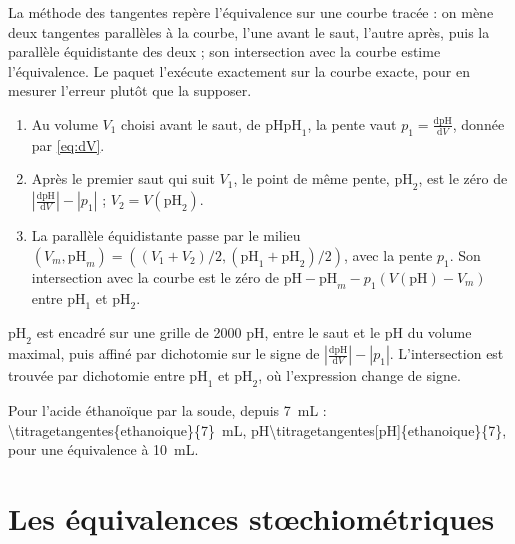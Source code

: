 \documentclass[a4paper,11pt]{article}
\newcommand\pH{\ensuremath{\mathrm{pH}}\xspace}
\newcommand\ddp[2]{\frac{\mathrm{d}#1}{\mathrm{d}#2}}
\newcommand\pare[1]{\left(#1\right)}
\begin{document}
La méthode des tangentes repère l'équivalence sur une courbe tracée : on mène deux tangentes parallèles à la courbe, l'une avant le saut, l'autre après, puis la parallèle équidistante des deux ; son intersection avec la courbe estime l'équivalence.
Le paquet l'exécute exactement sur la courbe exacte, pour en mesurer l'erreur plutôt que la supposer.
\begin{enumerate}
\item Au volume $V_1$ choisi avant le saut, de \pH $\pH_1$, la pente vaut $p_1=\ddp\pH V$, donnée par \eqref{eq:dV}.
\item Après le premier saut qui suit $V_1$, le point de même pente, $\pH_2$, est le zéro de $\left|\ddp\pH V\right|-|p_1|$ ; $V_2=V(\pH_2)$.
\item La parallèle équidistante passe par le milieu $\pare{V_m,\pH_m}=\pare{(V_1+V_2)/2,(\pH_1+\pH_2)/2}$, avec la pente $p_1$.
Son intersection avec la courbe est le zéro de $\pH-\pH_m-p_1\pare{V(\pH)-V_m}$ entre $\pH_1$ et $\pH_2$.
\end{enumerate}
\begin{algo}
$\pH_2$ est encadré sur une grille de 2000 \pH, entre le saut et le \pH du volume maximal, puis affiné par dichotomie sur le signe de $\left|\ddp\pH V\right|-|p_1|$.
L'intersection est trouvée par dichotomie entre $\pH_1$ et $\pH_2$, où l'expression change de signe.
\end{algo}
Pour l'acide éthanoïque par la soude, depuis \qty{7}{mL} : \qty{\titragetangentes{ethanoique}{7}}{mL}, \pH \num{\titragetangentes[pH]{ethanoique}{7}}, pour une équivalence à \qty{10}{mL}.


\section{Les équivalences stœchiométriques}\label{sec:equivalences}
\end{document}
